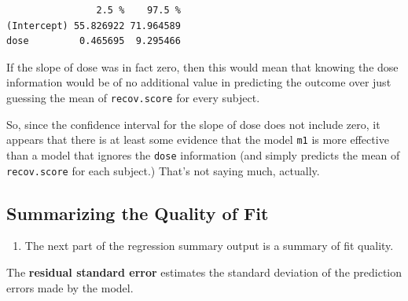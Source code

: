\documentclass[
]{book}
\providecommand{\tightlist}{%
  \setlength{\itemsep}{0pt}\setlength{\parskip}{0pt}}
\begin{document}
\begin{verbatim}
                2.5 %    97.5 %
(Intercept) 55.826922 71.964589
dose         0.465695  9.295466
\end{verbatim}

If the slope of dose was in fact zero, then this would mean that knowing the dose information would be of no additional value in predicting the outcome over just guessing the mean of \texttt{recov.score} for every subject.

So, since the confidence interval for the slope of dose does not include zero, it appears that there is at least some evidence that the model \texttt{m1} is more effective than a model that ignores the \texttt{dose} information (and simply predicts the mean of \texttt{recov.score} for each subject.) That's not saying much, actually.

\hypertarget{summarizing-the-quality-of-fit}{%
\subsection{Summarizing the Quality of Fit}\label{summarizing-the-quality-of-fit}}

\begin{enumerate}
\def\labelenumi{\arabic{enumi}.}
\setcounter{enumi}{3}
\tightlist
\item
  The next part of the regression summary output is a summary of fit quality.
\end{enumerate}

The \textbf{residual standard error} estimates the standard deviation of the prediction errors made by the model.
\end{document}
